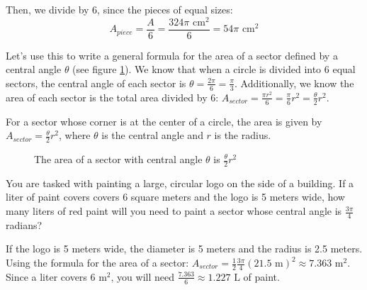Then, we divide by 6, since the pieces of equal sizes:
$$A_{piece} = \frac{A}{6} = \frac{324\pi\text{ cm}^2}{6} = 54\pi\text{ cm}^2$$

Let's use this to write a general formula for the area of a sector defined by a 
central angle $\theta$ (see figure \ref{fig:sector}). We know that when a 
circle is divided into 6 equal sectors, the central angle of each sector is 
$\theta = \frac{2\pi}{6} = \frac{\pi}{3}$. Additionally, we know the area of 
each sector is the total area divided by 6: $A_{sector} = \frac{\pi r^2}{6} = 
\frac{\pi}{6} r^2 = \frac{\theta}{2} r^2$. 

\begin{mdframed}[style=important, frametitle={Area of a sector}]
For a sector whose corner is at the center of a circle, the area is given by 
$A_{sector} = \frac{\theta}{2} r^2$, where $\theta$ is the central angle and $r$ is the radius. 

\end{mdframed}

\begin{figure}[htbp]
\centering
{}
    \caption{The area of a sector with central angle $\theta$ is $\frac{\theta}{2}r^2$}
    \label{fig:sector}
\end{figure}

\begin{Exercise}[title = {Area of a sector}, label = sector]
You are tasked with painting a large, circular logo on the side of a building. 
If a liter of paint covers covers 6 square meters and the logo is 5 meters 
wide, how many liters of red paint will you need to paint a sector whose central 
angle is $\frac{3\pi}{4}$ radians?
\end{Exercise}

\begin{Answer}[ref = sector]
If the logo is 5 meters wide, the diameter is 5 meters and the radius is 2.5 
meters. Using the formula for the area of a sector: $A_{sector} = \frac{1}{2}
\frac{3\pi}{4}(21.5\text{ m})^2 \approx 7.363\text{ m}^2$. Since a liter covers 
$6\text{ m}^2$, you will need $\frac{7.363}{6} \approx 1.227\text{ L}$ of paint. 
\end{Answer}

